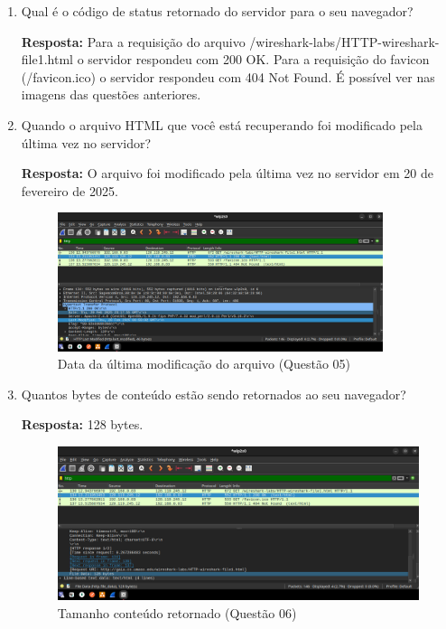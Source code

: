 \documentclass[12pt,a4paper]{report}
\begin{document}
\begin{enumerate}
		\item Qual é o código de status retornado do servidor para o seu navegador?
		
		\textbf{Resposta:} Para a requisição do arquivo /wireshark-labs/HTTP-wireshark-file1.html o servidor respondeu com 200 OK. Para a requisição do favicon (/favicon.ico) o servidor respondeu com 404 Not Found. É possível ver nas imagens das questões anteriores.

		\item Quando o arquivo HTML que você está recuperando foi modificado pela última vez no servidor?

		\textbf{Resposta:} O arquivo foi modificado pela última vez no servidor em 20 de fevereiro de 2025.

		\begin{figure}[H]
			\centering
			\includegraphics[width=0.9\textwidth]{q5.png}
			\caption{Data da última modificação do arquivo (Questão 05)}
			\label{fig:dataUltimaModificacao}
		\end{figure}

		\item Quantos bytes de conteúdo estão sendo retornados ao seu navegador?
		
		\textbf{Resposta:} 128 bytes.

		\begin{figure}[H]
			\centering
			\includegraphics[width=1\textwidth]{q6.png}
			\caption{Tamanho conteúdo retornado (Questão 06)}
			\label{fig:tamanhoConteudo}
		\end{figure}


\end{enumerate}
\end{document}
